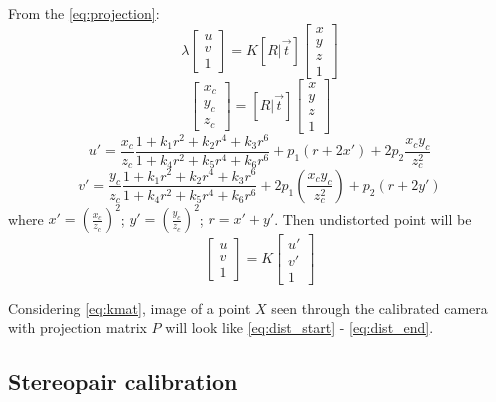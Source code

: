 From the \autoref{eq:projection}:
\begin{equation}
    \label{eq:dist_start}
    \lambda \begin{bmatrix} 
        u \\ v \\ 1 \end{bmatrix} = K [R | \vec{t}] \begin{bmatrix} x \\ y \\ z \\ 1
    \end{bmatrix}
\end{equation}
\begin{equation}
    \begin{bmatrix} x_c \\ y_c \\ z_c \end{bmatrix}
     = [R | \vec{t}] \begin{bmatrix} x \\ y \\ z \\ 1
    \end{bmatrix}
\end{equation}
\begin{equation}
    u' = \frac{x_c}{z_c} \frac{1 + k_1r^2 + k_2r^4 + k_3r^6}{1 + k_4r^2 + k_5r^4 + k_6r^6} + p_1(r + 2x') + 2p_2\frac{x_c y_c}{z^2_c}
\end{equation}
\begin{equation}
    v' = \frac{y_c}{z_c} \frac{1 + k_1r^2 + k_2r^4 + k_3r^6}{1 + k_4r^2 + k_5r^4 + k_6r^6} + 2p_1(\frac{x_c y_c}{z_c^2}) + p_2(r + 2y')
\end{equation}
where $x' = (\frac{x_c}{z_c})^2$; $y' = (\frac{y_c}{z_c})^2$; $r = x' + y'$. Then undistorted point will be
\begin{equation}
    \label{eq:dist_end}
    \begin{bmatrix} u \\ v \\ 1 \end{bmatrix} = K \begin{bmatrix} u' \\ v' \\ 1 \end{bmatrix}
\end{equation}

Considering \autoref{eq:kmat}, image of a point $X$ seen through the calibrated camera with projection matrix $P$ will look like \autoref{eq:dist_start} - \autoref{eq:dist_end}.



\subsection{Stereopair calibration}
